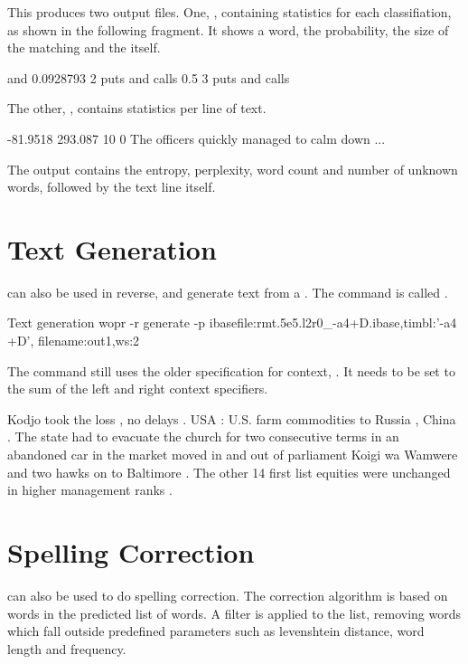 \documentclass[a4paper,10pt,twoside]{report}
\begin{document}
This produces two output files. One, , containing
statistics for each classifiation, as shown in the following fragment. It
shows a word, the \ngram{} probability, the size of the matching
\ngram{} and the \ngram{} itself.

\begin{wout}{}
and 0.0928793 2 puts and
calls 0.5 3 puts and calls
\end{wout}

The other, , contains statistics per line of text.

\begin{wout}{}
-81.9518 293.087 10 0 The officers quickly managed to calm down ...
\end{wout}

The output contains the entropy, perplexity, word count and number of
unknown words, followed by the text line itself.

\section{Text Generation}

\Wopr{} can also be used in reverse, and generate text from a
\lm{}. The command is called .

\begin{bash}{Text generation}
wopr -r generate -p ibasefile:rmt.5e5.l2r0_-a4+D.ibase,timbl:'-a4 +D',
                    filename:out1,ws:2
\end{bash}

The command still uses the older specification for context,
. It needs to be set to the sum of the left and right context
specifiers. 

\begin{wout}{}
Kodjo took the loss , no delays . 
USA : U.S. farm commodities to Russia , China . 
The state had to evacuate the church for two consecutive terms in an 
   abandoned car in the market moved in and out of parliament Koigi 
   wa Wamwere and two hawks on to Baltimore . 
The other 14 first list equities were unchanged in higher management
   ranks . 
\end{wout}


\section{Spelling Correction}

\Wopr{} can also be used to do spelling correction. The correction
algorithm is based on words in the predicted list of words. A filter
is applied to the list, removing words which fall outside predefined
parameters such as levenshtein distance, word length and frequency.
\end{document}
